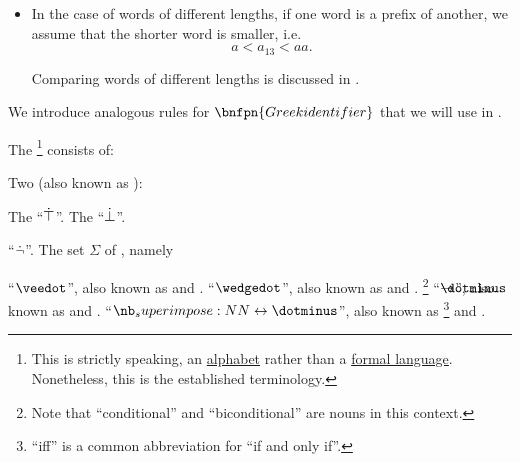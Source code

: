 \begin{remark}
\begin{itemize}
    \item In the case of words of different lengths, if one word is a prefix of another, we assume that the shorter word is smaller, i.e.
    \begin{equation*}
      a < a_{13} < aa.
    \end{equation*}

    Comparing words of different lengths is discussed in .
  \end{itemize}

  We introduce analogous rules for \( \bnfpn{Greek identifier} \) that we will use in .
\end{remark}

\begin{definition}\label{def:propositional_language}
  The \footnote{This is strictly speaking, an \hyperref[def:formal_language]{alphabet} rather than a \hyperref[def:formal_language/language]{formal language}. Nonetheless, this is the established terminology.} consists of:

  \begin{thmenum}
     Two  (also known as ):
    \begin{thmenum}
       The  \enquote{\( \dot\top \)}.
       The  \enquote{\( \dot\bot \)}.
    \end{thmenum}

      \enquote{\( \dot\neg \)}.
     The set \( \Sigma \) of , namely
    \begin{thmenum}
        \enquote{\( \synvee \)}, also known as \hyperref[def:standard_boolean_operators]{} and \hyperref[def:lattice/join]{}.
        \enquote{\( \synwedge \)}, also known as \hyperref[def:standard_boolean_operators]{} and \hyperref[def:lattice/meet]{}.
       \footnote{Note that \enquote{conditional} and \enquote{biconditional} are nouns in this context.} \enquote{\( \synimplies \)}, also known as  and \hyperref[def:material_implication]{}.
        \enquote{\( \syniff \)}, also known as \footnote{\enquote{iff} is a common abbreviation for \enquote{if and only if}.} and .
    \end{thmenum}


\end{thmenum}
\end{definition}
